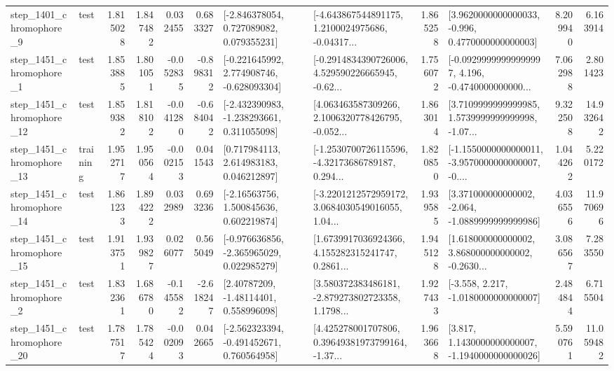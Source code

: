 \begin{tabular}{llrrrrllrlrr}
  step\_1401\_chromophore\_9 &      test &      1.815028 &    1.847482 &      0.032455 &  0.683327 &    [-2.846378054, 0.727089082, 0.079355231] &  [-4.643867544891175, 1.2100024975686, -0.04317... &       1.865258 &   [3.9620000000000033, -0.996, 0.4770000000000003] &            8.209940 &          6.163914 \\
  step\_1451\_chromophore\_1 &      test &      1.853885 &    1.801051 &     -0.052835 & -0.898312 &   [-0.221645992, 2.774908746, -0.628093304] &  [-0.2914834390726006, 4.529590226665945, -0.62... &       1.756072 &  [-0.09299999999999997, 4.196, -0.4740000000000... &            7.062988 &          2.801423 \\
 step\_1451\_chromophore\_12 &      test &      1.859382 &    1.818102 &     -0.041280 & -0.684042 &   [-2.432390983, -1.238293661, 0.311055098] &  [4.063463587309266, 2.1006320778426795, -0.052... &       1.863014 &  [3.7109999999999985, 1.5739999999999998, -1.07... &            9.322508 &         14.932642 \\
 step\_1451\_chromophore\_13 &  training &      1.952717 &    1.950564 &     -0.002153 &  0.041543 &     [0.717984113, 2.614983183, 0.046212897] &  [-1.2530700726115596, -4.32173686789187, 0.294... &       1.820850 &  [-1.1550000000000011, -3.9570000000000007, -0.... &            1.044262 &          5.220172 \\
 step\_1451\_chromophore\_14 &      test &      1.861233 &    1.894222 &      0.032989 &  0.693236 &     [-2.16563756, 1.500845636, 0.602219874] &  [-3.2201212572959172, 3.0684030549016055, 1.04... &       1.939585 &   [3.371000000000002, -2.064, -1.0889999999999986] &            4.036556 &         11.970696 \\
 step\_1451\_chromophore\_15 &      test &      1.913751 &    1.939827 &      0.026077 &  0.565049 &   [-0.976636856, -2.365965029, 0.022985279] &  [1.6739917036924366, 4.155282315241747, 0.2861... &       1.945128 &  [1.618000000000002, 3.868000000000002, -0.2630... &            3.086567 &          7.283550 \\
  step\_1451\_chromophore\_2 &      test &      1.832361 &    1.686780 &     -0.145582 & -2.618247 &      [2.40787209, -1.48114401, 0.558996098] &  [3.580372383486181, -2.879273802723358, 1.1798... &       1.927433 &               [-3.558, 2.217, -1.0180000000000007] &            2.484844 &          6.715504 \\
 step\_1451\_chromophore\_20 &      test &      1.787517 &    1.785424 &     -0.002093 &  0.042665 &   [-2.562323394, -0.491452671, 0.760564958] &  [4.425278001707806, 0.39649381973799164, -1.37... &       1.963668 &   [3.817, 1.1430000000000007, -1.1940000000000026] &            5.590761 &         11.059482 \\

\end{tabular}

